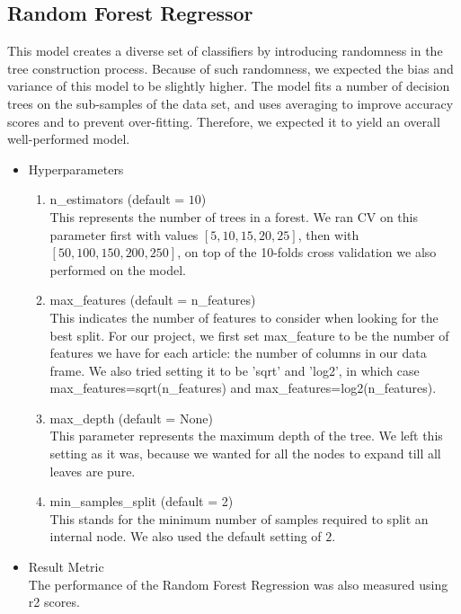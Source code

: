 \subsection{Random Forest Regressor}
This model creates a diverse set of classifiers by introducing randomness in the tree construction process. Because of such randomness, we expected the bias and variance of this model to be slightly higher. The model fits a number of decision trees on the sub-samples of the data set, and uses averaging to improve accuracy scores and to prevent over-fitting. Therefore, we expected it to yield an overall well-performed model. 
\begin{itemize}
      \item Hyperparameters
  \begin{enumerate}
    \item n\_estimators (default = $10$)\\
    This represents the number of trees in a forest. We ran CV on this parameter first with values $[5,10,15,20,25]$, then with $[50,100,150,200,250]$, on top of the 10-folds cross validation we also performed on the model.
    \item max\_features (default = n\_features)\\
    This indicates the number of features to consider when looking for the best split. For our project, we first set max\_feature to be the number of features we have for each article: the number of columns in our data frame. We also tried setting it to be 'sqrt' and 'log2', in which case max\_features=sqrt(n\_features) and max\_features=log2(n\_features).
    \item max\_depth (default = None)\\
    This parameter represents the maximum depth of the tree. We left this setting as it was, because we wanted for all the nodes to expand till all leaves are pure. 
     \item min\_samples\_split (default = 2)\\
    This stands for the minimum number of samples required to split an internal node. We also used the default setting of $2$.
    \end{enumerate}
    \item Result Metric\\
    The performance of the Random Forest Regression was also measured using r2 scores.\\
 \end{itemize}
